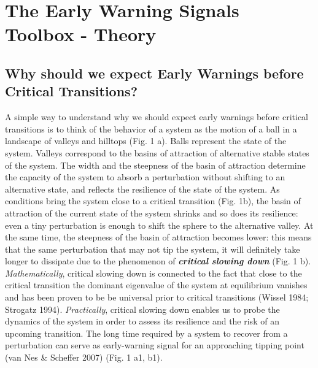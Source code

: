 \documentclass[12pt,a4paper,final]{article}
\begin{document}
\section{The Early Warning Signals Toolbox - Theory} 

\subsection{Why should we expect Early Warnings before Critical Transitions?}
A simple way to understand why we should expect early warnings before critical transitions is to think of the behavior of a system as the motion of a ball in a landscape of valleys and hilltops (Fig. 1 a). Balls represent the state of the system. Valleys correspond to the basins of attraction of alternative stable states of the system. The width and the steepness of the basin of attraction determine the capacity of the system to absorb a perturbation without shifting to an alternative state, and reflects the resilience of the state of the system. As conditions bring the system close to a critical transition (Fig. 1b), the basin of attraction of the current state of the system shrinks and so does its resilience: even a tiny perturbation is enough to shift the sphere to the alternative valley. At the same time, the steepness of the basin of attraction becomes lower: this means that the same perturbation that may not tip the system, it will definitely take longer to dissipate due to the phenomenon of \textit{\textbf{critical slowing down}} (Fig. 1 b). \textit{Mathematically}, critical slowing down is connected to the fact that close to the critical transition the dominant eigenvalue of the system at equilibrium vanishes and has been proven to be be universal prior to critical transitions  (Wissel 1984; Strogatz 1994). \textit{Practically}, critical slowing down enables us to probe the dynamics of the system in order to assess its resilience and the risk of an upcoming transition. The long time required by a system to recover from a perturbation can serve as early-warning signal for an approaching tipping point (van Nes & Scheffer 2007) (Fig. 1 a1, b1).
\end{document}

